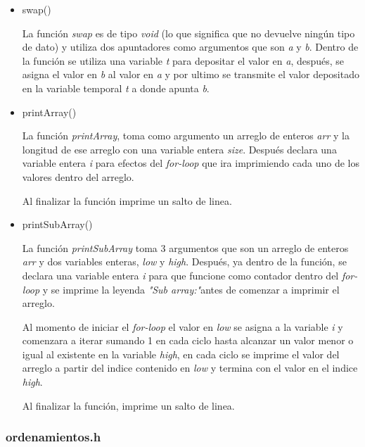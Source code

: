 \documentclass{article}
\begin{document}
			\begin{itemize}
				
				\item swap()
				
				La función \emph{swap} es de tipo \emph{void} (lo que significa que no devuelve ningún tipo de dato) y utiliza dos apuntadores como argumentos que son \emph{a} y \emph{b}. Dentro de la función se utiliza una variable \emph{t} para depositar el valor en \emph{a}, después, se asigna el valor en \emph{b} al valor en \emph{a} y por ultimo se transmite el valor depositado en la variable temporal \emph{t} a donde apunta \emph{b}.
				
				\item printArray()
				
				La función \emph{printArray}, toma como argumento un arreglo de enteros \emph{arr} y la longitud de ese arreglo con una variable entera \emph{size}. Después declara una variable entera \emph{i} para efectos del \emph{for-loop} que ira imprimiendo cada uno de los valores dentro del arreglo.
				
				Al finalizar la función imprime un salto de linea.
				
				\item printSubArray()
				
				La función \emph{printSubArray} toma 3 argumentos que son un arreglo de enteros \emph{arr} y dos variables enteras, \emph{low} y \emph{high}. Después, ya dentro de la función, se declara una variable entera \emph{i} para que funcione como contador dentro del \emph{for-loop} y se imprime la leyenda \emph{"Sub array:"}antes de comenzar a imprimir el arreglo.
				
				Al momento de iniciar el \emph{for-loop} el valor en \emph{low} se asigna a la variable \emph{i} y comenzara a iterar sumando 1 en cada ciclo hasta alcanzar un valor menor o igual al existente en la variable \emph{high}, en cada ciclo se imprime el valor del arreglo a partir del indice contenido en \emph{low} y termina con el valor en el indice \emph{high}.
				
				Al finalizar la función, imprime un salto de linea.
				
			\end{itemize}
			
			
			\subsubsection{ordenamientos.h}
			
\end{document}
